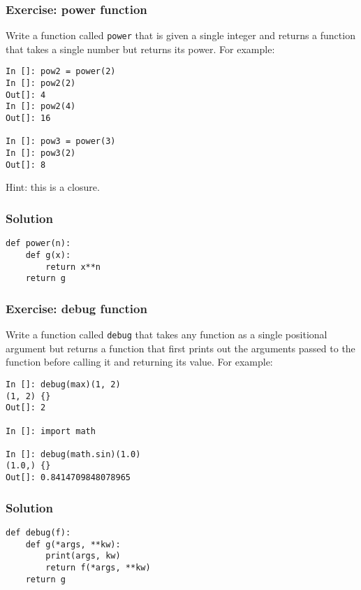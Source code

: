 \documentclass[14pt,compress,aspectratio=169]{beamer}
\begin{document}
\begin{frame}
  \frametitle{Exercise: power function}
  \begin{block}{}
    Write a function called \lstinline{power} that is given a single integer
    and returns a function that takes a single number but returns its power.
    For example:
  \end{block}

\begin{lstlisting}
In []: pow2 = power(2)
In []: pow2(2)
Out[]: 4
In []: pow2(4)
Out[]: 16

In []: pow3 = power(3)
In []: pow3(2)
Out[]: 8
\end{lstlisting}
  Hint: this is a closure.
\end{frame}


\begin{frame}
  \frametitle{Solution}
\begin{lstlisting}
def power(n):
    def g(x):
        return x**n
    return g

\end{lstlisting}
\end{frame}


\begin{frame}
  \frametitle{Exercise: debug function}
  \begin{block}{}
    Write a function called \lstinline{debug} that takes any function as a
    single positional argument but returns a function that first prints out
    the arguments passed to the function before calling it and returning its
    value. For example:
  \end{block}

\begin{lstlisting}
In []: debug(max)(1, 2)
(1, 2) {}
Out[]: 2

In []: import math

In []: debug(math.sin)(1.0)
(1.0,) {}
Out[]: 0.8414709848078965

\end{lstlisting}
\end{frame}


\begin{frame}
  \frametitle{Solution}
\begin{lstlisting}
def debug(f):
    def g(*args, **kw):
        print(args, kw)
        return f(*args, **kw)
    return g
\end{lstlisting}
\end{frame}
\end{document}

